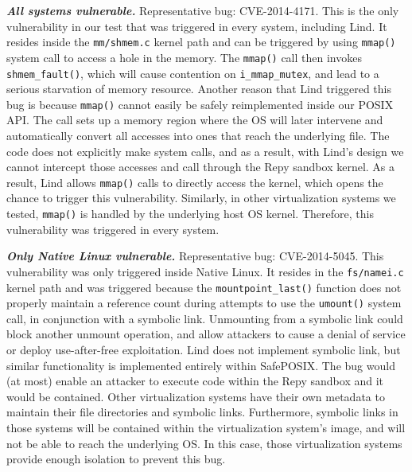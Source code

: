 {{{\emph{\textbf{All systems vulnerable.}}  Representative bug: CVE-2014-4171.
This is the only vulnerability in our test that was triggered in every
system, including Lind. It resides inside the \texttt{mm/shmem.c} kernel path and
can be triggered by using \texttt{mmap()} system call to access a hole in the memory.
The \texttt{mmap()} call then invokes \texttt{shmem\_fault()}, which will cause contention
on \texttt{i\_mmap\_mutex}, and lead to a serious starvation of memory resource.
Another reason that Lind triggered this bug is because \texttt{mmap()} cannot easily
be safely reimplemented inside our POSIX API. The call sets up a
memory region where the OS will later
intervene and automatically convert all accesses into ones that reach the
underlying file.  The code does not explicitly make system calls, and as
a result, with Lind's design we cannot intercept those accesses and call through
the Repy sandbox kernel. As a result,
Lind allows \texttt{mmap()} calls to directly access the kernel, which
opens the chance to trigger this vulnerability. Similarly, in other
virtualization systems we tested, \texttt{mmap()} is handled by the underlying
host OS kernel.
Therefore, this vulnerability was triggered in every system.

\emph{\textbf{Only Native Linux vulnerable.}}  Representative bug: CVE-2014-5045.
This vulnerability was only triggered inside Native Linux. It resides in the
\texttt{fs/namei.c} kernel path and was triggered because
the \texttt{mountpoint\_last()}
function does not properly
maintain a reference count during attempts to use the \texttt{umount()} system call,
in conjunction with a symbolic link. Unmounting from a symbolic link could block
 another unmount operation, and allow attackers to cause a denial of service or
 deploy use-after-free exploitation. Lind does not implement symbolic link, but
 similar functionality is implemented entirely
within SafePOSIX.  The bug would (at most) enable an attacker to execute
code within the Repy sandbox and it would be contained.
Other virtualization systems have their own metadata to maintain their file
directories and symbolic links.
Furthermore, symbolic links in those systems will be contained within the virtualization system's image,
and will not be able to reach the underlying OS. In this case, those virtualization systems provide enough
isolation to prevent this bug.

}}}
